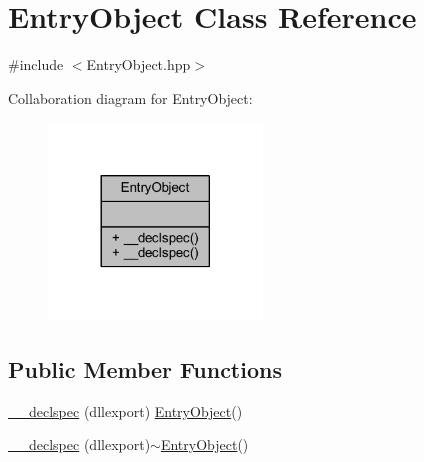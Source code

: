 \hypertarget{class_entry_object}{\section{Entry\-Object Class Reference}
\label{class_entry_object}
}


{\ttfamily \#include $<$Entry\-Object.\-hpp$>$}



Collaboration diagram for Entry\-Object\-:\nopagebreak
\begin{figure}[H]
\begin{center}
\leavevmode
\includegraphics[width=161pt]{class_entry_object__coll__graph}
\end{center}
\end{figure}
\subsection*{Public Member Functions}
\begin{DoxyCompactItemize}
\item 
\hyperlink{class_entry_object_ab4e66efd2938e31fb3bf55b5a04d2c7f}{\-\_\-\-\_\-declspec} (dllexport) \hyperlink{class_entry_object}{Entry\-Object}()
\item 
\hyperlink{class_entry_object_a9fdcee4a71ed9a99551b512bca6da9bd}{\-\_\-\-\_\-declspec} (dllexport)$\sim$\hyperlink{class_entry_object}{Entry\-Object}()
\end{DoxyCompactItemize}


